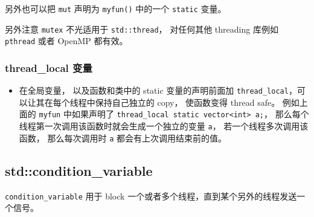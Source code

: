 另外也可以把 \verb|mut| 声明为 \verb|myfun()| 中的一个 \verb|static| 变量。

另外注意 \verb|mutex| 不光适用于 \verb|std::thread|， 对任何其他 threading 库例如 \verb|pthread| 或者 OpenMP 都有效。


\subsubsection{thread\_local 变量}
\begin{itemize}
\item 在全局变量， 以及函数和类中的 static 变量的声明前面加 \verb|thread_local|，可以让其在每个线程中保持自己独立的 copy， 使函数变得 thread safe。 例如上面的 \verb|myfun| 中如果声明了 \verb|thread_local static vector<int> a;|， 那么每个线程第一次调用该函数时就会生成一个独立的变量 \verb|a|， 若一个线程多次调用该函数， 那么每次调用时 \verb|a| 都会有上次调用结束前的值。
\end{itemize}

\subsection{std::condition\_variable}
\verb`condition_variable` 用于 block 一个或者多个线程，直到某个另外的线程发送一个信号。


